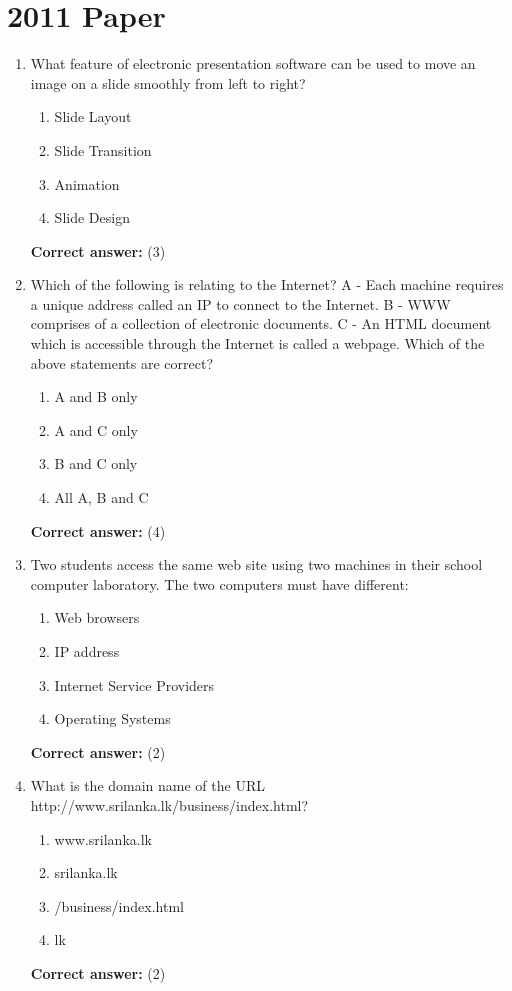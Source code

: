 \documentclass[12pt]{article}
\begin{document}
\section*{2011 Paper}
\begin{enumerate}[label=Q\arabic*:,leftmargin=*,resume]
\item What feature of electronic presentation software can be used to move an image on a slide smoothly from left to right?\\
\begin{enumerate}[label=(\arabic*)]
\item Slide Layout
\item Slide Transition
\item Animation
\item Slide Design
\end{enumerate}
\textbf{Correct answer:} (3)

\item Which of the following is relating to the Internet? A - Each machine requires a unique address called an IP to connect to the Internet. B - WWW comprises of a collection of electronic documents. C - An HTML document which is accessible through the Internet is called a webpage. Which of the above statements are correct?\\
\begin{enumerate}[label=(\arabic*)]
\item A and B only
\item A and C only
\item B and C only
\item All A, B and C
\end{enumerate}
\textbf{Correct answer:} (4)

\item Two students access the same web site using two machines in their school computer laboratory. The two computers must have different:\\
\begin{enumerate}[label=(\arabic*)]
\item Web browsers
\item IP address
\item Internet Service Providers
\item Operating Systems
\end{enumerate}
\textbf{Correct answer:} (2)

\item What is the domain name of the URL http://www.srilanka.lk/business/index.html?\\
\begin{enumerate}[label=(\arabic*)]
\item www.srilanka.lk
\item srilanka.lk
\item /business/index.html
\item lk
\end{enumerate}
\textbf{Correct answer:} (2)


\end{enumerate}
\end{document}
